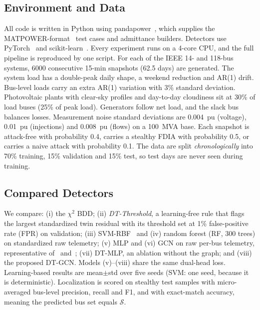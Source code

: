 \subsection{Environment and Data}
All code is written in Python using pandapower~\cite{thurner2018pandapower}, which supplies the MATPOWER-format~\cite{zimmerman2011matpower} test cases and admittance builders. Detectors use PyTorch~\cite{paszke2019pytorch} and scikit-learn~\cite{pedregosa2011sklearn}. Every experiment runs on a 4-core CPU, and the full pipeline is reproduced by one script. For each of the IEEE 14- and 118-bus systems, 6000 consecutive 15-min snapshots (62.5 days) are generated. The system load has a double-peak daily shape, a weekend reduction and AR(1) drift. Bus-level loads carry an extra AR(1) variation with 3\% standard deviation. Photovoltaic plants with clear-sky profiles and day-to-day cloudiness sit at 30\% of load buses (25\% of peak load). Generators follow net load, and the slack bus balances losses. Measurement noise standard deviations are 0.004~pu (voltage), 0.01~pu (injections) and 0.008~pu (flows) on a 100~MVA base. Each snapshot is attack-free with probability 0.4, carries a stealthy FDIA with probability 0.5, or carries a naive attack with probability 0.1. The data are split \emph{chronologically} into 70\% training, 15\% validation and 15\% test, so test days are never seen during training.

\subsection{Compared Detectors}
We compare: (i) the $\chi^2$ BDD; (ii) \emph{DT-Threshold}, a learning-free rule that flags the largest standardized twin residual with its threshold set at 1\% false-positive rate (FPR) on validation; (iii) SVM-RBF~\cite{esmalifalak2017svm} and (iv) random forest (RF, 300 trees) on standardized raw telemetry; (v) MLP and (vi) GCN on raw per-bus telemetry, representative of~\cite{he2017deep} and~\cite{boyaci2022joint}; (vii) DT-MLP, an ablation without the graph; and (viii) the proposed DT-GCN. Models (v)--(viii) share the same dual-head loss. Learning-based results are mean$\pm$std over five seeds (SVM: one seed, because it is deterministic). Localization is scored on stealthy test samples with micro-averaged bus-level precision, recall and F1, and with exact-match accuracy, meaning the predicted bus set equals $\mathcal{S}$.
